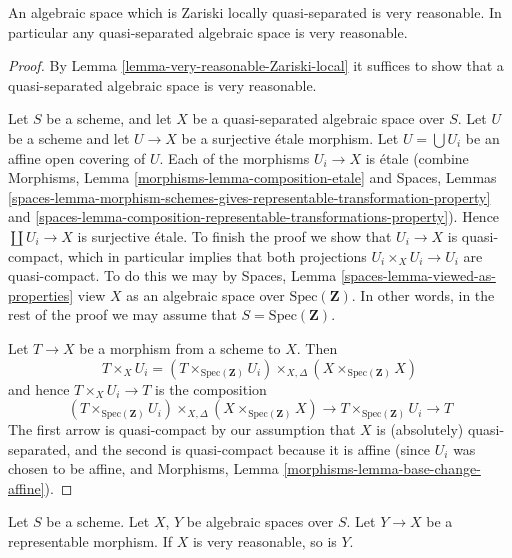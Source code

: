 \begin{lemma}
\label{lemma-quasi-separated-very-reasonable}
An algebraic space which is Zariski locally quasi-separated is very reasonable.
In particular any quasi-separated algebraic space is very reasonable.
\end{lemma}

\begin{proof}
By Lemma \ref{lemma-very-reasonable-Zariski-local}
it suffices to show that a quasi-separated algebraic space is very reasonable.

\medskip\noindent
Let $S$ be a scheme, and let $X$ be a quasi-separated algebraic space
over $S$. Let $U$ be a scheme and let $U \to X$ be a surjective \'etale
morphism. Let $U = \bigcup U_i$ be an affine open covering of $U$.
Each of the morphisms $U_i \to X$ is \'etale (combine
Morphisms, Lemma \ref{morphisms-lemma-composition-etale}
and
Spaces, Lemmas
\ref{spaces-lemma-morphism-schemes-gives-representable-transformation-property}
and
\ref{spaces-lemma-composition-representable-transformations-property}).
Hence $\coprod U_i \to X$ is surjective \'etale.
To finish the proof we show that $U_i \to X$ is quasi-compact, which
in particular implies that both projections $U_i \times_X U_i \to U_i$ are
quasi-compact. To do this we may by
Spaces, Lemma \ref{spaces-lemma-viewed-as-properties}
view $X$ as an algebraic space over $\text{Spec}(\mathbf{Z})$.
In other words, in the rest of the proof we may assume that
$S = \text{Spec}(\mathbf{Z})$.

\medskip\noindent
Let $T \to X$ be a morphism from a scheme to $X$. Then
$$
T \times_X U_i
=
(T \times_{\text{Spec}(\mathbf{Z})} U_i)
\times_{X, \Delta}
(X \times_{\text{Spec}(\mathbf{Z})} X)
$$
and hence $T \times_X U_i \to T$ is the composition
$$
(T \times_{\text{Spec}(\mathbf{Z})} U_i)
\times_{X, \Delta}
(X \times_{\text{Spec}(\mathbf{Z})} X)
\longrightarrow
T \times_{\text{Spec}(\mathbf{Z})} U_i
\longrightarrow T
$$
The first arrow is quasi-compact by our assumption that $X$ is
(absolutely) quasi-separated, and the second is quasi-compact because
it is affine (since $U_i$ was chosen to be affine, and
Morphisms, Lemma \ref{morphisms-lemma-base-change-affine}).
\end{proof}

\begin{lemma}
\label{lemma-representable-very-reasonable}
Let $S$ be a scheme.
Let $X$, $Y$ be algebraic spaces over $S$.
Let $Y \to X$ be a representable morphism.
If $X$ is very reasonable, so is $Y$.
\end{lemma}

